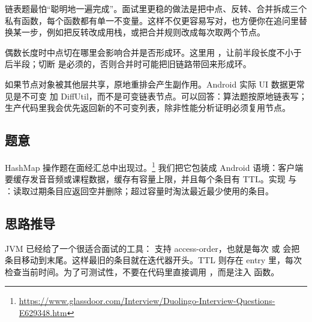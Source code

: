 \begin{idea}
链表题最怕“聪明地一遍完成”。面试里更稳的做法是把中点、反转、合并拆成三个私有函数，每个函数都有单一不变量。这样不仅更容易写对，也方便你在追问里替换某一步，例如把反转改成用栈，或把合并规则改成每次取两个节点。
\end{idea}

\begin{pitfall}[快慢指针的偶数长度边界]
偶数长度时中点切在哪里会影响合并是否形成环。这里用 ，让前半段长度不小于后半段；切断  是必须的，否则合并时可能把旧链路带回来形成环。
\end{pitfall}

\begin{followup}
如果节点对象被其他层共享，原地重排会产生副作用。Android 实际 UI 数据更常见是不可变  加 DiffUtil，而不是可变链表节点。可以回答：算法题按原地链表写；生产代码里我会优先返回新的不可变列表，除非性能分析证明必须复用节点。
\end{followup}


\subsection*{题意}

HashMap 操作题在面经汇总中出现过。\srccommunity\footnote{\url{https://www.glassdoor.com/Interview/Duolingo-Interview-Questions-E629348.htm}} 我们把它包装成 Android 语境：客户端要缓存发音音频或课程数据，缓存有容量上限，并且每个条目有 TTL。实现  与 ：读取过期条目应返回空并删除；超过容量时淘汰最近最少使用的条目。

\subsection*{思路推导}

JVM 已经给了一个很适合面试的工具： 支持 access-order，也就是每次  或  会把条目移动到末尾。这样最旧的条目就在迭代器开头。TTL 则存在 entry 里，每次  检查当前时间。为了可测试性，不要在代码里直接调用 ，而是注入  函数。

